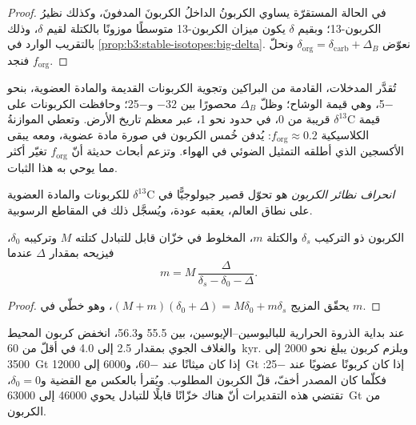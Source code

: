 \begin{proof}
في الحالة المستقرّة يساوي الكربونُ الداخلُ الكربونَ المدفونَ، وكذلك
نظيرُ الكربون-13؛ وبقيم $\delta$ يكون ميزان الكربون-13 متوسطًا موزونًا بالكتلة
لقيم $\delta$، وذلك بالتقريب الوارد في
\cref{prop:b3:stable-isotopes:big-delta}. نعوّض $\delta_{\mathrm{org}} =
\delta_{\mathrm{carb}} + \Delta_B$ ونحلّ فنجد $f_{\mathrm{org}}$.
\end{proof}

تُقدَّر المدخلات، القادمة من البراكين وتجوية الكربونات القديمة والمادة العضوية،
بنحو \qty{-5}{\permil}، وهي قيمة الوشاح؛ وظلّ $\Delta_B$ محصورًا بين
$-32$ و\qty{-25}{\permil}؛ وحافظت الكربونات على
قيمة $\delta^{13}\mathrm C$ قريبة من 0، في حدود نحو \qty{1}{\permil}، عبر معظم
تاريخ الأرض. وتعطي الموازنةُ الكلاسيكية $f_{\mathrm{org}} \approx
0.2$: يُدفن خُمس الكربون في صورة مادة عضوية، ومعه يبقى
الأكسجين الذي أطلقه التمثيل الضوئي في الهواء. وتزعم أبحاث حديثة أنّ
$f_{\mathrm{org}}$ تغيّر أكثر مما يوحي به هذا الثبات.

\begin{definition}\label{def:b3:stable-isotopes:cie}
\emph{انحراف نظائر الكربون} هو
تحوّل قصير جيولوجيًّا في $\delta^{13}\mathrm C$ للكربونات والمادة العضوية
على نطاق العالم، يعقبه عودة، ويُسجَّل ذلك في المقاطع الرسوبية.
\end{definition}

\begin{proposition}\label{prop:b3:stable-isotopes:cie-mass}
الكربون ذو التركيب $\delta_s$ والكتلة $m$، المخلوط في خزّان قابل للتبادل
كتلته $M$ وتركيبه $\delta_0$، فيزيحه بمقدار $\Delta$ عندما
\[
m = M\,\frac{\Delta}{\delta_s - \delta_0 - \Delta}.
\]
\end{proposition}

\begin{proof}
يحقّق المزيج $(M + m)(\delta_0 + \Delta) = M\delta_0 + m\delta_s$، وهو خطّي في
$m$.
\end{proof}

عند بداية الذروة الحرارية للباليوسين--الإيوسين، بين 55.5
و\qty{56.3}{\Ma}، انخفض كربون المحيط والغلاف الجوي بمقدار 2.5 إلى
\qty{4.0}{\permil} في أقلّ من \qty{60}{kyr}. ويلزم كربون يبلغ نحو
2000 إلى \qty{3500}{Gt} إذا كان ميثانًا عند \qty{-60}{\permil}، و6000 إلى
\qty{12000}{Gt} إذا كان كربونًا عضويًا عند \qty{-25}{\permil}: فكلّما كان المصدر أخفّ،
قلّ الكربون المطلوب. ويُقرأ بالعكس مع القضية
و$\delta_0 = 0$، تقتضي هذه التقديرات أنّ هناك خزّانًا قابلًا للتبادل يحوي \num{46000}
إلى \qty{63000}{Gt} من الكربون.


